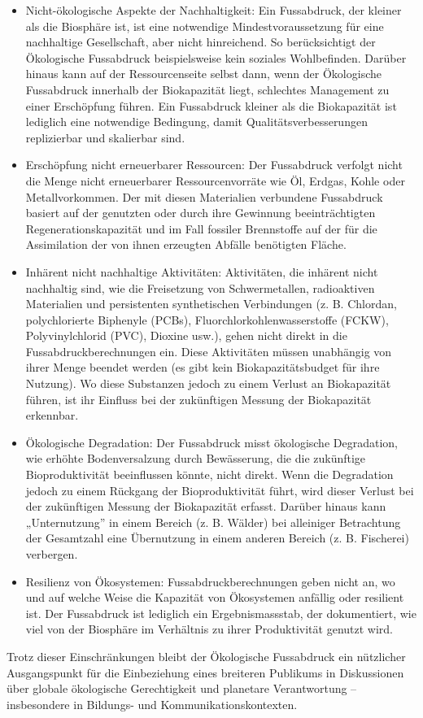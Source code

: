 \documentclass[
  nswissgerman,
  a4paper,
  DIV=11,
  numbers=noendperiod,
  oneside,
  openany]{scrreprt}
\begin{document}
\begin{tcolorbox}
\begin{itemize}
\item
  Nicht-ökologische Aspekte der Nachhaltigkeit: Ein Fussabdruck, der
  kleiner als die Biosphäre ist, ist eine notwendige
  Mindestvoraussetzung für eine nachhaltige Gesellschaft, aber nicht
  hinreichend. So berücksichtigt der Ökologische Fussabdruck
  beispielsweise kein soziales Wohlbefinden. Darüber hinaus kann auf der
  Ressourcenseite selbst dann, wenn der Ökologische Fussabdruck
  innerhalb der Biokapazität liegt, schlechtes Management zu einer
  Erschöpfung führen. Ein Fussabdruck kleiner als die Biokapazität ist
  lediglich eine notwendige Bedingung, damit Qualitätsverbesserungen
  replizierbar und skalierbar sind.
\item
  Erschöpfung nicht erneuerbarer Ressourcen: Der Fussabdruck verfolgt
  nicht die Menge nicht erneuerbarer Ressourcenvorräte wie Öl, Erdgas,
  Kohle oder Metallvorkommen. Der mit diesen Materialien verbundene
  Fussabdruck basiert auf der genutzten oder durch ihre Gewinnung
  beeinträchtigten Regenerationskapazität und im Fall fossiler
  Brennstoffe auf der für die Assimilation der von ihnen erzeugten
  Abfälle benötigten Fläche.
\item
  Inhärent nicht nachhaltige Aktivitäten: Aktivitäten, die inhärent
  nicht nachhaltig sind, wie die Freisetzung von Schwermetallen,
  radioaktiven Materialien und persistenten synthetischen Verbindungen
  (z. B. Chlordan, polychlorierte Biphenyle (PCBs),
  Fluorchlorkohlenwasserstoffe (FCKW), Polyvinylchlorid (PVC), Dioxine
  usw.), gehen nicht direkt in die Fussabdruckberechnungen ein. Diese
  Aktivitäten müssen unabhängig von ihrer Menge beendet werden (es gibt
  kein Biokapazitätsbudget für ihre Nutzung). Wo diese Substanzen jedoch
  zu einem Verlust an Biokapazität führen, ist ihr Einfluss bei der
  zukünftigen Messung der Biokapazität erkennbar.
\item
  Ökologische Degradation: Der Fussabdruck misst ökologische
  Degradation, wie erhöhte Bodenversalzung durch Bewässerung, die die
  zukünftige Bioproduktivität beeinflussen könnte, nicht direkt. Wenn
  die Degradation jedoch zu einem Rückgang der Bioproduktivität führt,
  wird dieser Verlust bei der zukünftigen Messung der Biokapazität
  erfasst. Darüber hinaus kann „Unternutzung'' in einem Bereich (z. B.
  Wälder) bei alleiniger Betrachtung der Gesamtzahl eine Übernutzung in
  einem anderen Bereich (z. B. Fischerei) verbergen.
\item
  Resilienz von Ökosystemen: Fussabdruckberechnungen geben nicht an, wo
  und auf welche Weise die Kapazität von Ökosystemen anfällig oder
  resilient ist. Der Fussabdruck ist lediglich ein Ergebnismassstab, der
  dokumentiert, wie viel von der Biosphäre im Verhältnis zu ihrer
  Produktivität genutzt wird.
\end{itemize}

Trotz dieser Einschränkungen bleibt der Ökologische Fussabdruck ein
nützlicher Ausgangspunkt für die Einbeziehung eines breiteren Publikums
in Diskussionen über globale ökologische Gerechtigkeit und planetare
Verantwortung -- insbesondere in Bildungs- und Kommunikationskontexten.

\end{tcolorbox}
\end{document}
